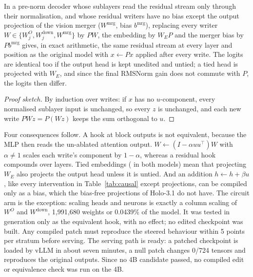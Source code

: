 \begin{proposition}\label{prop:equiv}
In a pre-norm decoder whose sublayers read the residual stream only through their normalisation, and whose residual writers have no bias except the output projection of the vision merger ($W^{\text{mrg}}$, bias $b^{\text{mrg}}$), replacing every writer $W\in\{W^O_j, W^{\text{down}}_j, W^{\text{mrg}}\}$ by $PW$, the embedding by $W_EP$ and the merger bias by $Pb^{\text{mrg}}$ gives, in exact arithmetic, the same residual stream at every layer and position as the original model with $x\leftarrow Px$ applied after every write. The logits are identical too if the output head is kept unedited and untied; a tied head is projected with $W_E$, and since the final RMSNorm gain does not commute with $P$, the logits then differ.
\end{proposition}
\begin{proof}[Proof sketch]
By induction over writes: if $x$ has no $u$-component, every normalised sublayer input is unchanged, so every $z$ is unchanged, and each new write $PWz=P(Wz)$ keeps the sum orthogonal to $u$.
\end{proof}
Four consequences follow. A hook at block outputs is not equivalent, because the MLP then reads the un-ablated attention output. $W\leftarrow(I-\alpha uu^\top)W$ with $\alpha\neq1$ scales each write's component by $1-\alpha$, whereas a residual hook compounds over layers. Tied embeddings (\cfgBigTied{} in both models) mean that projecting $W_E$ also projects the output head unless it is untied. And an addition $h\leftarrow h+\beta u$, like every intervention in Table~\ref{tab:causal} except projections, can be compiled only as a bias, which the bias-free projections of Holo-3.1 do not have. The circuit arm is the exception: scaling heads and neurons is exactly a column scaling of $W^O$ and $W^{\text{down}}$, 1{,}991{,}680 weights or 0.0439\% of the model. It was tested in generation only as the equivalent hook, with no effect; no edited checkpoint was built. %
Any compiled patch must reproduce the steered behaviour within 5 points per stratum before serving. The serving path is ready: a patched checkpoint is loaded by vLLM in about seven minutes, a null patch changes 0/724 tensors and reproduces the original outputs. %
Since no 4B candidate passed, no compiled edit or equivalence check was run on the 4B.
\FloatBarrier
